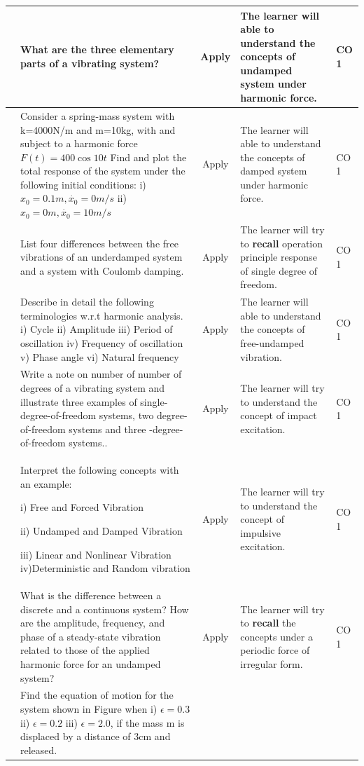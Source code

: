 \documentclass[11pt,paper=a4,answers]{exam}
\begin{document}
\begin{flushleft}
\begin{longtable}{|>{\centering\arraybackslash}p{0.8cm}  | >{\raggedright\arraybackslash}p{6.5cm}  | c | >{\raggedright\arraybackslash}p{5cm} |>{\centering\arraybackslash}p{1cm}|}
\hline 
12& What are the three elementary parts of a vibrating system? &	Apply&	The learner will able to understand the concepts of undamped system under harmonic force.&	CO 1\\
\hline 

13&	Consider a spring-mass system with k=4000N/m and m=10kg, with and subject to a harmonic
force $F(t)=400\cos 10t$ Find and plot the total response of the system under the following
initial conditions:
i) $x_{0}=0.1m, \dot{x_{0}}=0m/s$
ii) $x_{0}=0m, \dot{x_{0}}=10m/s$
&	Apply&	The learner will able to understand the concepts of damped system under harmonic force.&	CO 1\\
\hline 
14&List four differences between the free vibrations of an underdamped system and
a system with Coulomb damping. &		Apply&	The learner will try to \textbf{recall} operation principle response of single degree of freedom.&	CO 1\\
\hline 
15&	Describe in detail the following terminologies w.r.t harmonic analysis. i) Cycle ii) Amplitude iii) Period of oscillation iv) Frequency of oscillation v) Phase angle vi) Natural frequency	&	Apply&	The learner will able to understand the concepts of free-undamped vibration.&	CO 1\\
\hline 
16& Write a  note on number of number of degrees of a vibrating system and illustrate three examples of single-degree-of-freedom systems, two degree-of-freedom systems and three -degree-of-freedom systems..
&	Apply&	The learner will try to understand the concept of impact excitation. &	CO 1\\
\hline 
17&Interpret the following concepts with an example:

i) Free and Forced Vibration 

ii) Undamped and Damped Vibration 

iii) Linear and Nonlinear Vibration
iv)Deterministic and Random vibration&	Apply&	The learner will try to understand the concept of impulsive excitation.&	CO 1\\
\hline 
18&  	What is the difference between a discrete and a continuous system? How are the amplitude, frequency, and phase of a steady-state vibration related to those
of the applied harmonic force for an undamped system?	&	Apply&	The learner will try to \textbf{recall} the concepts under a periodic force of irregular form.  &	CO 1\\
\hline 
19&Find the equation of motion for the system shown in Figure when i) $\epsilon=0.3 $	ii) $\epsilon=0.2 $ iii) $\epsilon=2.0$, if the mass m is displaced by a distance of 3cm and released. 


\end{longtable}
\end{flushleft}
\end{document}
